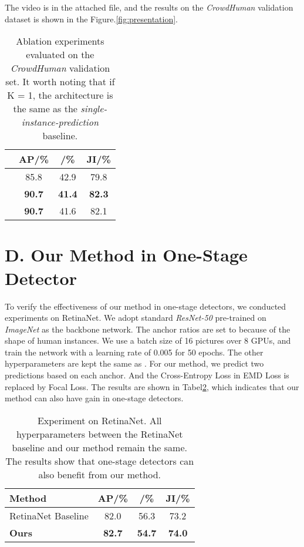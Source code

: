 \documentclass[10pt,twocolumn,letterpaper]{article}
\begin{document}
The video is in the attached file, and the results on the \emph{CrowdHuman} 
validation dataset is shown in the Figure.\ref{fig:presentation}.

\makeatletter
\makeatother

\begin{table}
   \begin{center}
   \begin{tabular}{c|c|c|c}
   \hline\hline
   & AP/\% & /\%  & JI/\% \\
   \hline\hline
    & 85.8 & 42.9 & 79.8 \\
    & {\bf 90.7} & {\bf 41.4} & {\bf 82.3 }\\
    & {\bf 90.7} & 41.6 & 82.1 \\
   \hline
   \end{tabular}
   \end{center}
   \caption{
      Ablation experiments evaluated on the \emph{CrowdHuman} validation set.
      It worth noting that if K = 1, the architecture is the same as the
      \emph{single-instance-prediction} baseline.}
   \label{tab:k3}
\end{table}
\quad

\section*{D. Our Method in One-Stage Detector}
To verify the effectiveness of our method in one-stage detectors, 
we conducted experiments on RetinaNet\cite{lin2017focal}.
We adopt standard \emph{ResNet-50} pre-trained on \emph{ImageNet} as the backbone network.
The anchor ratios are set to  because of the shape of
human instances.
We use a batch size of 16 pictures over 8 GPUs, and train the network with
a learning rate of 0.005 for 50 epochs.
The other hyperparameters are kept the same as \cite{lin2017focal}.
For our method, we predict two predictions based on each anchor.
And the Cross-Entropy Loss in EMD Loss is replaced by Focal Loss\cite{lin2017focal}.
The results are shown in Tabel\ref{tbl:retina},
which indicates that our method can also have gain in one-stage detectors.
\begin{table}[t]
   \centering
   \begin{tabular}{l|c|c|c}
   \toprule
   Method & AP/\% & /\%  & JI/\% \\
   \hline
   RetinaNet Baseline & 82.0 & 56.3 & 73.2\\
   \hline
   \textbf{Ours} & \textbf{82.7} & \textbf{54.7} & \textbf{74.0}\\
   \bottomrule
   \end{tabular}
   \caption{
      Experiment on RetinaNet\cite{lin2017focal}.
      All hyperparameters between the RetinaNet baseline and our method
      remain the same.
      The results show that one-stage detectors can also benefit from our
      method.}
   \label{tbl:retina}
\end{table}
\end{document}
